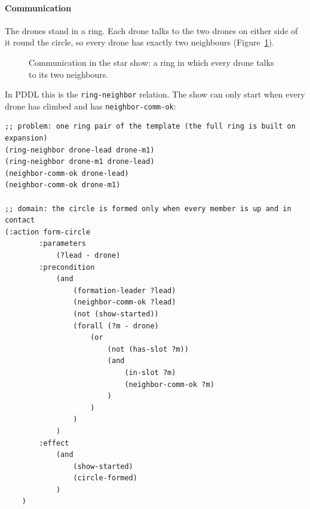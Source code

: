 \documentclass[11pt,a4paper,oneside]{report}
\newcommand{\code}[1]{\texttt{#1}}
\begin{document}
\paragraph{Communication}
The drones stand in a ring. Each drone talks to the two drones on either side of it round the
circle, so every drone has exactly two neighbours (Figure~\ref{fig:comm-star}).

\begin{figure}[H]
\centering
{}
\caption[Communication in the star show]{Communication in the star show: a ring in which every
drone talks to its two neighbours.}
\label{fig:comm-star}
\end{figure}

\noindent In PDDL this is the \code{ring-neighbor} relation. The show can only start when every
drone has climbed and has \code{neighbor-comm-ok}:

\begin{lstlisting}
;; problem: one ring pair of the template (the full ring is built on expansion)
(ring-neighbor drone-lead drone-m1)
(ring-neighbor drone-m1 drone-lead)
(neighbor-comm-ok drone-lead)
(neighbor-comm-ok drone-m1)

;; domain: the circle is formed only when every member is up and in contact
(:action form-circle
        :parameters
            (?lead - drone)
        :precondition
            (and
                (formation-leader ?lead)
                (neighbor-comm-ok ?lead)
                (not (show-started))
                (forall (?m - drone)
                    (or
                        (not (has-slot ?m))
                        (and
                            (in-slot ?m)
                            (neighbor-comm-ok ?m)
                        )
                    )
                )
            )
        :effect
            (and
                (show-started)
                (circle-formed)
            )
    )
\end{lstlisting}
\end{document}
